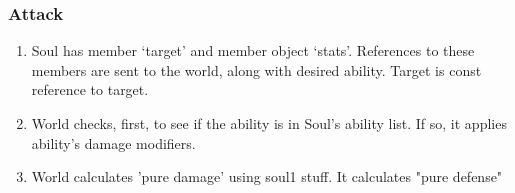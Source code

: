 \documentclass{article}
\begin{document}
\subsubsection*{Attack}
\begin{enumerate} 
    \item Soul has member `target' and member object `stats'.  
        References to these members are sent to the world, along with 
        desired ability. Target is const reference to target.

    \item World checks, first, to see if the ability is in Soul's
        ability list. If so, it applies ability's damage modifiers.

    \item World calculates 'pure damage' using soul1 stuff. It calculates "pure defense" 

\end{enumerate}
\end{document}
